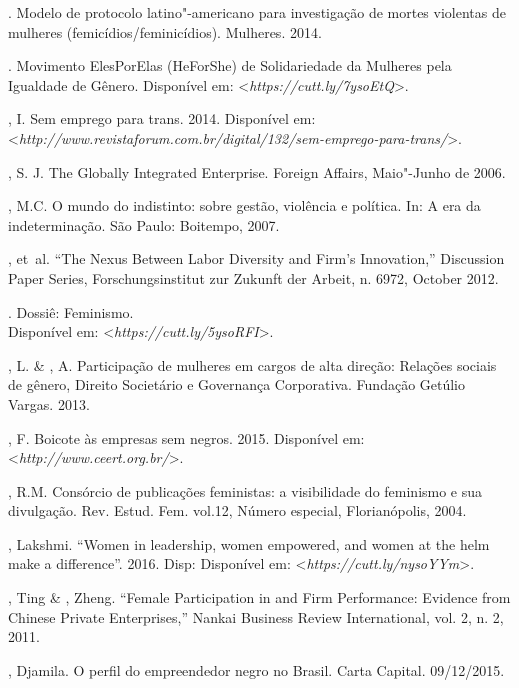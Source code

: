 \begin{Parskip}
. Modelo de protocolo latino"-americano para investigação de
mortes violentas de mulheres (femicídios/feminicídios).  Mulheres.
2014.

. Movimento ElesPorElas (HeForShe) de Solidariedade da 
Mulheres pela Igualdade de Gênero.
Disponível em: \textless{}\emph{https://cutt.ly/7ysoEtQ}\textgreater{}.

, I. Sem emprego para trans. 2014.
Disponível em: \textless{}\emph{http://www.revistaforum.com.br/digital/132/sem-emprego-para-trans/}\textgreater{}.

, S. J. The Globally Integrated Enterprise. Foreign Affairs,
Maio"-Junho de 2006.

, M.C. O mundo do indistinto: sobre gestão, violência e política.
In: A era da indeterminação. São Paulo: Boitempo, 2007.

, et~al. ``The Nexus Between Labor Diversity and Firm's
Innovation,'' Discussion Paper Series, Forschungsinstitut zur Zukunft
der Arbeit, n. 6972, October 2012.

. Dossiê: Feminismo.\\
Disponível em: \textless{}\emph{https://cutt.ly/5ysoRFI}\textgreater{}.

, L. \& , A. Participação de mulheres em cargos de alta
direção: Relações sociais de gênero, Direito Societário e Governança
Corporativa. Fundação Getúlio Vargas. 2013.

, F. Boicote às empresas sem negros. 2015.
Disponível em: \textless{}\emph{http://www.ceert.org.br/}\textgreater{}.

, R.M. Consórcio de publicações feministas: a visibilidade do
feminismo e sua divulgação. Rev. Estud. Fem. vol.12, Número especial,
Florianópolis, 2004.

, Lakshmi. ``Women in leadership, women empowered, and women at the
helm make a difference''. 2016. Disp:
Disponível em: \textless{}\emph{https://cutt.ly/nysoYYm}\textgreater{}.

, Ting \& , Zheng. ``Female Participation in  and Firm
Performance: Evidence from Chinese Private Enterprises,'' Nankai
Business Review International, vol. 2, n. 2, 2011.

, Djamila. O perfil do empreendedor negro no Brasil. Carta
Capital. 09/12/2015.


\end{Parskip}
